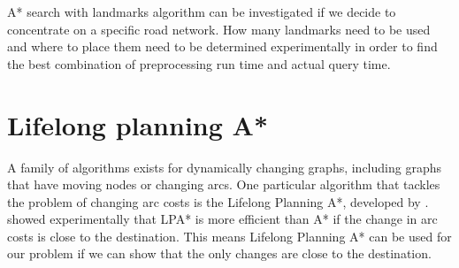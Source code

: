 A* search with landmarks algorithm can be investigated
if we decide to concentrate on a specific road network.
How many landmarks need to be used and where to place them need to be 
determined experimentally in order to find the best combination of preprocessing run time and actual query time.



\section{Lifelong planning A*}
A family of algorithms exists for dynamically changing graphs,
including graphs that have moving nodes or changing arcs.
One particular algorithm that tackles the problem of changing arc costs is the Lifelong Planning A*, developed by \citet{LPA*}.
\citet{LPA*} showed experimentally that LPA* is more efficient than A* if the change in arc costs is close to the destination.
This means Lifelong Planning A* can be used for our problem if we can show that the only changes are close to the destination.

